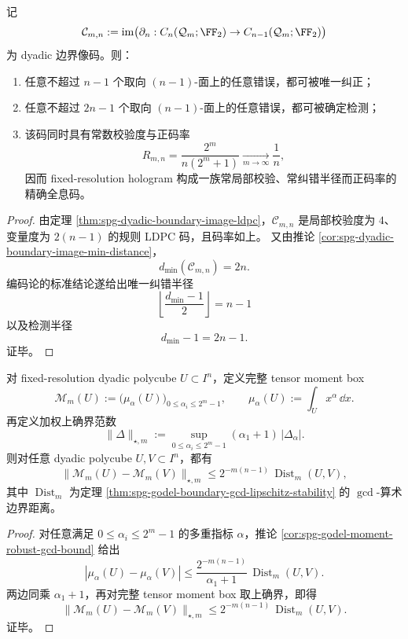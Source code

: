 \begin{corollary}\label{cor:conclusion-fixed-resolution-hologram-exact-error-radius}
记
\[
\mathcal C_{m,n}:=\operatorname{im}\bigl(\partial_n:C_n(\mathcal Q_m;\FF_2)\to C_{n-1}(\mathcal Q_m;\FF_2)\bigr)
\]
为 dyadic 边界像码。则：
\begin{enumerate}
  \item 任意不超过 \(n-1\) 个取向 \((n-1)\)-面上的任意错误，都可被唯一纠正；
  \item 任意不超过 \(2n-1\) 个取向 \((n-1)\)-面上的任意错误，都可被确定检测；
  \item 该码同时具有常数校验度与正码率
        \[
        R_{m,n}=\frac{2^m}{n(2^m+1)}\xrightarrow[m\to\infty]{}\frac1n,
        \]
        因而 fixed-resolution hologram 构成一族常局部校验、常纠错半径而正码率的精确全息码。
\end{enumerate}
\end{corollary}

\begin{proof}
由定理 \ref{thm:spg-dyadic-boundary-image-ldpc}，\(\mathcal C_{m,n}\) 是局部校验度为 \(4\)、变量度为 \(2(n-1)\) 的规则 LDPC 码，且码率如上。
又由推论 \ref{cor:spg-dyadic-boundary-image-min-distance}，
\[
d_{\min}(\mathcal C_{m,n})=2n.
\]
编码论的标准结论遂给出唯一纠错半径
\[
\left\lfloor\frac{d_{\min}-1}{2}\right\rfloor=n-1
\]
以及检测半径
\[
d_{\min}-1=2n-1.
\]
证毕。
\end{proof}

\begin{theorem}\label{thm:conclusion-boundary-arithmetic-distance-tensor-box-contraction}
对 fixed-resolution dyadic polycube \(U\subset I^n\)，定义完整 tensor moment box
\[
\mathcal M_m(U):=\bigl(\mu_\alpha(U)\bigr)_{0\le \alpha_i\le 2^m-1},
\qquad
\mu_\alpha(U):=\int_U x^\alpha\,\dd x.
\]
再定义加权上确界范数
\[
\|\Delta\|_{\star,m}
:=
\sup_{0\le \alpha_i\le 2^m-1}
(\alpha_1+1)\,|\Delta_\alpha|.
\]
则对任意 dyadic polycube \(U,V\subset I^n\)，都有
\[
\|\mathcal M_m(U)-\mathcal M_m(V)\|_{\star,m}
\le
2^{-m(n-1)}\,\operatorname{Dist}_m(U,V),
\]
其中 \(\operatorname{Dist}_m\) 为定理 \ref{thm:spg-godel-boundary-gcd-lipschitz-stability} 的 \(\gcd\)-算术边界距离。
\end{theorem}

\begin{proof}
对任意满足 \(0\le \alpha_i\le 2^m-1\) 的多重指标 \(\alpha\)，推论 \ref{cor:spg-godel-moment-robust-gcd-bound} 给出
\[
|\mu_\alpha(U)-\mu_\alpha(V)|
\le
\frac{2^{-m(n-1)}}{\alpha_1+1}\,\operatorname{Dist}_m(U,V).
\]
两边同乘 \(\alpha_1+1\)，再对完整 tensor moment box 取上确界，即得
\[
\|\mathcal M_m(U)-\mathcal M_m(V)\|_{\star,m}
\le
2^{-m(n-1)}\,\operatorname{Dist}_m(U,V).
\]
证毕。
\end{proof}

